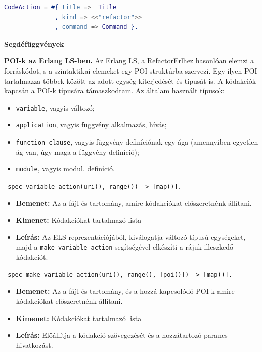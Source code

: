 \lstset{caption=Egy példa a kódakcióra, label=src:erlang}\label{codeActionExample}
\begin{lstlisting}[language={erlang}]
CodeAction = #{ title =>  Title
              , kind => <<"refactor">>
              , command => Command }.
\end{lstlisting}

\noindent \textbf{Segdéfüggvények}

\textbf{POI-k az Erlang LS-ben.} Az Erlang LS, a RefactorErlhez hasonlóan elemzi a forráskódot, s a szintaktikai elemeket egy POI struktúrba szervezi. Egy ilyen POI tartalmazza többek között az adott egység kiterjedését és típusát is. A kódakciók kapcsán a POI-k típusára támaszkodtam. Az általam használt típusok:
\begin{itemize}
    \item \lstinline{variable}, vagyis változó;
    \item \lstinline{application}, vagyis függvény alkalmazás, hívás;
    \item \lstinline{function_clause}, vagyis függvény definíciónak egy ága (amennyiben egyetlen ág van, úgy maga a függvény definíció);
    \item \lstinline{module}, vagyis modul. definíció.
    
\end{itemize}

\noindent \lstinline{-spec variable_action(uri(), range()) -> [map()].}
    \begin{itemize}
        \item \textbf{Bemenet:} Az a fájl és tartomány, amire kódakciókat előszeretnénk állítani.
        \item \textbf{Kimenet:} Kódakciókat tartalmazó lista
        \item \textbf{Leírás:} Az ELS reprezentációjából, kiválogatja változó típusú egységeket, majd a \lstinline{make_variable_action} segítségével elkészíti a rájuk illeszkedő kódakciót.
    \end{itemize}
    
    
    
\noindent \lstinline{-spec make_variable_action(uri(), range(), [poi()]) -> [map()].}
    \begin{itemize}
        \item \textbf{Bemenet:} Az a fájl és tartomány, és a hozzá kapcsolódó POI-k amire kódakciókat előszeretnénk állítani.
        \item \textbf{Kimenet:} Kódakciókat tartalmazó lista
        \item \textbf{Leírás:} Előállítja a kódakció szövegezését és a hozzátartozó parancs hivatkozást.
    \end{itemize}
    
